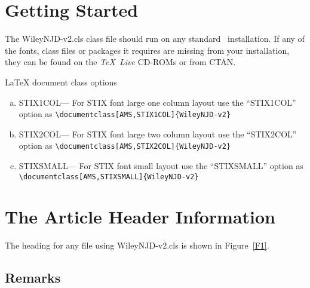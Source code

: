 \documentclass[AMS,STIX1COL]{WileyNJD-v2}
\begin{document}
\section{Getting Started} The \textsf{WileyNJD-v2.cls} class file should run
on any standard \LaTeXe\ installation. If any of the fonts, class
files or packages it requires are missing from your installation,
they can be found on the \emph{\TeX\ Live} CD-ROMs or from CTAN.

LaTeX document class options

\begin{flushleft}
\begin{enumerate}[a.]
\item STIX1COL--- For STIX font large one column layout use the ``STIX1COL'' option as \verb"\documentclass[AMS,STIX1COL]{WileyNJD-v2}"
\item STIX2COL--- For STIX font large two column layout use the ``STIX2COL'' option as \verb"\documentclass[AMS,STIX2COL]{WileyNJD-v2}"
\item STIXSMALL--- For STIX font small layout use the ``STIXSMALL'' option as \verb"\documentclass[AMS,STIXSMALL]{WileyNJD-v2}"
\end{enumerate}
\end{flushleft}



\section{The Article Header Information}
The heading for any file using \textsf{WileyNJD-v2.cls} is shown in
Figure~\ref{F1}.

\subsection{Remarks}
\end{document}
